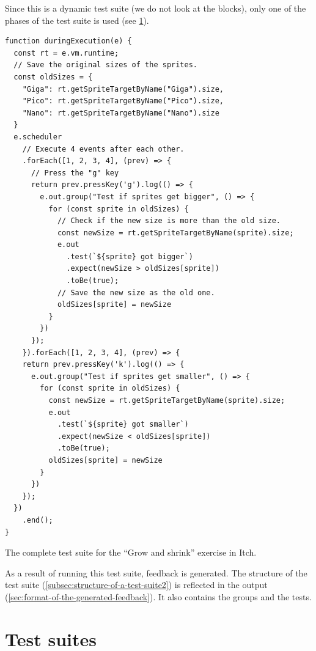 \documentclass[../main]{subfiles}
\begin{document}
Since this is a dynamic test suite (we do not look at the blocks), only one of the phases of the test suite is used (see \cref{sec:itch-test-suites}).

\begin{listing}
    \begin{verbatim}
function duringExecution(e) {
  const rt = e.vm.runtime;
  // Save the original sizes of the sprites.
  const oldSizes = {
    "Giga": rt.getSpriteTargetByName("Giga").size,
    "Pico": rt.getSpriteTargetByName("Pico").size,
    "Nano": rt.getSpriteTargetByName("Nano").size
  }
  e.scheduler
    // Execute 4 events after each other.
    .forEach([1, 2, 3, 4], (prev) => {
      // Press the "g" key
      return prev.pressKey('g').log(() => {
        e.out.group("Test if sprites get bigger", () => {
          for (const sprite in oldSizes) {
            // Check if the new size is more than the old size.
            const newSize = rt.getSpriteTargetByName(sprite).size;
            e.out
              .test(`${sprite} got bigger`)
              .expect(newSize > oldSizes[sprite])
              .toBe(true);
            // Save the new size as the old one.
            oldSizes[sprite] = newSize
          }
        })
      });
    }).forEach([1, 2, 3, 4], (prev) => {
    return prev.pressKey('k').log(() => {
      e.out.group("Test if sprites get smaller", () => {
        for (const sprite in oldSizes) {
          const newSize = rt.getSpriteTargetByName(sprite).size;
          e.out
            .test(`${sprite} got smaller`)
            .expect(newSize < oldSizes[sprite])
            .toBe(true);
          oldSizes[sprite] = newSize
        }
      })
    });
  })
    .end();
}
    \end{verbatim}
    \caption{The complete test suite for the ``Grow and shrink'' exercise in Itch.}
    \label{lst:itch-grow-and-shrink}
\end{listing}

As a result of running this test suite, feedback is generated.
The structure of the test suite (\cref{subsec:structure-of-a-test-suite2}) is reflected in the output (\cref{sec:format-of-the-generated-feedback}).
It also contains the groups and the tests.


%

\section{Test suites}\label{sec:itch-test-suites}
\end{document}
